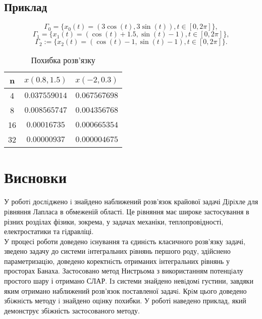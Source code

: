 \documentclass[a4 paper,12pt,ukrainian]{report}
\begin{document}
\section{Приклад}
\begin{equation*}
\Gamma_0 =\{x_0(t) = (3\cos(t),3\sin(t)), t \in [0,2\pi]\},
\end{equation*}
\begin{equation*}
\Gamma_1 =\{x_1(t) = (\cos(t)+1.5,\sin(t)-1), t \in [0,2\pi]\},
\end{equation*}
\begin{equation*}
\Gamma_2 :=\{x_2(t) = (\cos(t)-1,\sin(t)-1), t \in [0,2\pi]\}.
\end{equation*}
\begin{table}[h]
\caption{\label{tab:pr1}Похибка розв'язку}
\begin{center}
\begin{tabular}{|c|c|c|}
\hline
n & $x(0.8,1.5)$ & $x(-2,0.3)$\\
\hline
4 & $0.037559014$ & $0.067567698$\\
\hline
8 & $0.008565747$ & $0.004356768$\\
\hline
16 & $0.00016735$ & $0.000665354$\\
\hline
32 & $0.00000937$ & $0.000004675$\\
\hline
\end{tabular}
\end{center}
\end{table}
\chapter*{Висновки}
\hspace*{\parindent}У роботi дослiджено i знайдено наближений розв'язок крайової задачі Дiрiхле для рiвняння Лапласа в обмеженій області. Це рiвняння має широке застосування в різних розділах фізики, зокрема, у задачах механіки, теплопровідності, електростатики та гідравліці.\\
\hspace*{\parindent}У процесі роботи доведено iснування та єдинiсть класичного розв’язку задачі, зведено задачу до системи iнтегральних рiвнянь першого роду, здійснено параметризацiю, доведено коректнiсть отриманих інтегральних рівнянь у просторах Банаха. Застосовано метод
Нистрьома з використанням потенцiалу простого шару і отримано СЛАР. Iз системи знайдено невiдомi густини, завдяки яким отримано наближений розв’язок поставленої
задачi. Крiм цього доведено збiжнiсть методу i знайдено оцiнку похибки. У роботі наведено приклад, який демонструє збіжність застосованого методу.
\end{document}
